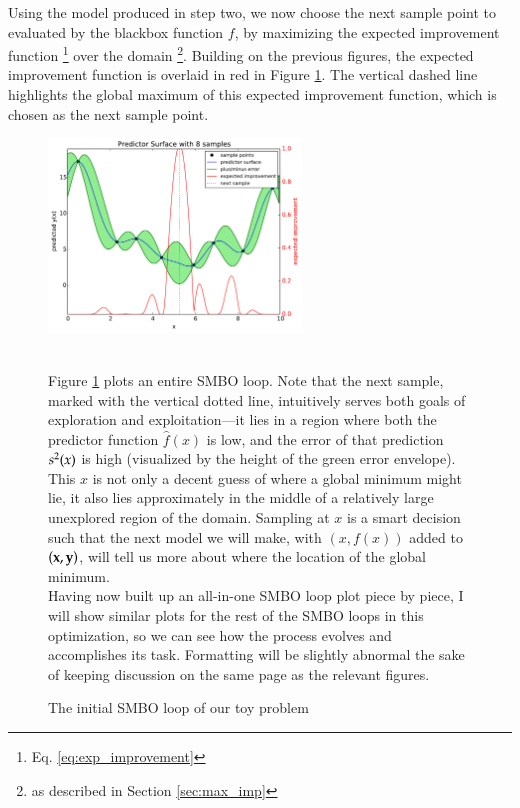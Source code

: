 Using the model produced in step two, we now choose the next sample point to evaluated by the blackbox function $f$, by maximizing the expected improvement function \footnote{Eq. \ref{eq:exp_improvement}} over the domain \footnote{as described in Section \ref{sec:max_imp}}. Building on the previous figures, the expected improvement function is overlaid in red in Figure \ref{fig:first_imp}. The vertical dashed line highlights the global maximum of this expected improvement function, which is chosen as the next sample point.

\begin{figure}[h!]
\centering
\includegraphics[width=0.6\textwidth]{images/ego_ex/0}
\caption{The initial SMBO loop of our toy problem\\}
\label{fig:first_imp}
\begin{minipage}{\textwidth}

\ \\ Figure \ref{fig:first_imp} plots an entire SMBO loop. Note that the next sample, marked with the vertical dotted line, intuitively serves both goals of exploration and exploitation---it lies in a region where both the predictor function $\hat{f}(x)$ is low, and the error of that prediction $s^2(x)$ is high (visualized by the height of the green error envelope). This $x$ is not only a decent guess of where a global minimum might lie, it also lies approximately in the middle of a relatively large unexplored region of the domain. Sampling at $x$ is a smart decision such that the next model we will make, with $(x,f(x))$ added to $(\mathbf{x},\mathbf{y})$, will tell us more about where the location of the global minimum.\\

Having now built up an all-in-one SMBO loop plot piece by piece, I will show similar plots for the rest of the SMBO loops in this optimization, so we can see how the process evolves and accomplishes its task. Formatting will be slightly abnormal the sake of keeping discussion on the same page as the relevant figures.


\end{minipage}

\end{figure}





